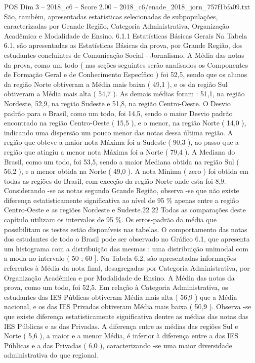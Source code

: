 \begin{textsample}{POS Dim 3 – 2018\_c6 – Score 2.00 – 2018\_c6/enade\_2018\_jorn\_757f1bfa09.txt}
São, também, apresentadas estatísticas selecionadas de subpopulações, caracterizadas por Grande Região, Categoria Administrativa, Organização Acadêmica e Modalidade de Ensino. 6.1.1 Estatísticas Básicas Gerais Na Tabela 6.1, são apresentadas as Estatísticas Básicas da prova, por Grande Região, dos estudantes concluintes de Comunicação Social - Jornalismo.
A Média das notas da prova, como um todo ( nas seções seguintes serão analisados os Componentes de Formação Geral e de Conhecimento Específico ) foi 52,5, sendo que os alunos da região Norte obtiveram a Média mais baixa ( 49,1 ), e os da região Sul obtiveram a Média mais alta ( 54,7 ).
As demais médias foram : 51,1, na região Nordeste, 52,9, na região Sudeste e 51,8, na região Centro-Oeste.
O Desvio padrão para o Brasil, como um todo, foi 14,5, sendo o maior Desvio padrão encontrado na região Centro-Oeste ( 15,5 ), e o menor, na região Norte ( 14,0 ), indicando uma dispersão um pouco menor das notas dessa última região.
A região que obteve a maior nota Máxima foi a Sudeste ( 90,3 ), ao passo que a região que atingiu a menor nota Máxima foi a Norte ( 79,4 ).
A Mediana do Brasil, como um todo, foi 53,5, sendo a maior Mediana obtida na região Sul ( 56,2 ), e a menor obtida na Norte ( 49,0 ).
A nota Mínima ( zero ) foi obtida em todas as regiões do Brasil, com exceção da região Norte onde esta foi 8,9.
Considerando -se as notas segundo Grande Região, observa -se que não existe diferença estatisticamente significativa ao nível de 95 \% apenas entre a região Centro-Oeste e as regiões Nordeste e Sudeste.22 22 Todas as comparações deste capítulo utilizam os intervalos de 95 \%.
Os erros-padrão da média que possibilitam os testes estão disponíveis nas tabelas.
O comportamento das notas dos estudantes de todo o Brasil pode ser observado no Gráfico 6.1, que apresenta um histograma com a distribuição das mesmas : uma distribuição unimodal com a moda no intervalo ( 50 ; 60 ].
Na Tabela 6.2, são apresentadas informações referentes à Média da nota final, desagregadas por Categoria Administrativa, por Organização Acadêmica e por Modalidade de Ensino.
A Média das notas da prova, como um todo, foi 52,5.
Em relação à Categoria Administrativa, os estudantes das IES Públicas obtiveram Média mais alta ( 56,9 ) que a Média nacional, e os das IES Privadas obtiveram Média mais baixa ( 50,9 ).
Observa -se que existe diferença estatisticamente significativa dentre as médias das notas das IES Públicas e as das Privadas.
A diferença entre as médias das regiões Sul e Norte ( 5,6 ), a maior e a menor Média, é inferior à diferença entre a das IES Públicas e a das Privadas ( 6,0 ), caracterizando -se uma maior diversidade administrativa do que regional.

\end{textsample}
